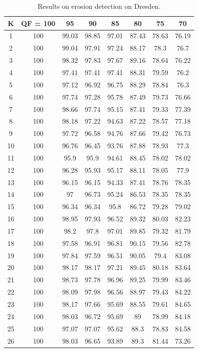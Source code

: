 \documentclass[review]{elsarticle}
\begin{document}
		
	\begin{longtable}{c|ccccccc}
		\caption{Results on erosion detection on Dresden.}
		\label{table:dresdenerosion}\\
		\hline\hline
		\textbf{K}&\textbf{QF = 100}&\textbf{95}&\textbf{90}&\textbf{85}&\textbf{80}&\textbf{75}&\textbf{70}\\
		\hline
		1&100&99.03&98.85&97.01&87.43&78.63&76.19\\
		2&100&99.04&97.91&97.24&88.17&78.3&76.7\\
		3&100&98.32&97.83&97.67&89.16&78.64&76.22\\
		4&100&97.41&97.41&97.41&88.31&79.59&76.2\\
		5&100&97.12&96.92&96.75&88.29&78.84&76.3\\
		6&100&97.74&97.28&95.78&87.49&79.73&76.66\\
		7&100&98.66&97.74&95.15&87.41&79.33&77.39\\
		8&100&98.18&97.22&94.63&87.22&78.57&77.18\\
		9&100&97.72&96.58&94.76&87.66&79.42&76.73\\
		10&100&96.76&96.45&93.76&87.88&78.93&77.3\\
		11&100&95.9&95.9&94.61&88.45&78.02&78.02\\
		12&100&96.28&95.93&95.17&88.11&78.05&77.9\\
		13&100&96.15&96.15&94.33&87.41&78.76&78.35\\
		14&100&97&96.73&95.24&86.53&78.35&78.35\\
		15&100&96.34&96.34&95.8&86.72&79.28&79.02\\
		16&100&98.95&97.93&96.52&89.32&80.03&82.23\\
		17&100&98.2&97.8&97.01&89.85&79.32&81.79\\
		18&100&97.58&96.91&96.81&90.15&79.56&82.78\\
		19&100&97.84&97.59&96.51&90.05&79.4&83.08\\
		20&100&98.17&98.17&97.21&89.45&80.18&83.64\\
		21&100&98.73&97.78&96.96&89.25&79.99&83.46\\
		22&100&98.09&97.98&96.56&88.97&79.43&84.22\\
		23&100&98.17&97.66&95.69&88.55&79.61&84.65\\
		24&100&98.03&96.72&95.69&89&78.99&84.18\\
		25&100&97.07&97.07&95.62&88.3&78.83&84.58\\
		26&100&98.03&96.65&93.89&89.3&81.44&73.26\\

\end{longtable}
\end{document}
